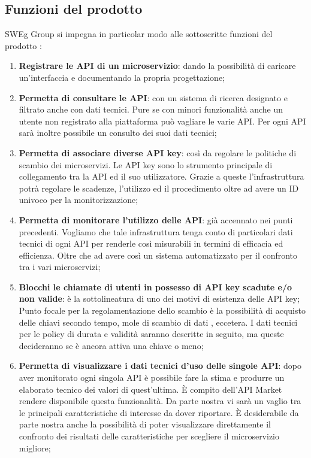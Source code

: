 \documentclass[12pt,a4paper,titlepage]{article}
\begin{document}
	\subsection{Funzioni del prodotto}
	SWEg Group si impegna in particolar modo alle sottoscritte funzioni del prodotto :
	\begin{enumerate}
		\item \textbf{Registrare le API di un microservizio}: dando la possibilità di caricare un'interfaccia e documentando la propria progettazione;
		\item \textbf{Permetta di consultare le API}: con un sistema di ricerca designato e filtrato anche con dati tecnici. Pure se con minori funzionalità anche un utente non registrato alla piattaforma può vagliare le varie API. Per ogni API sarà inoltre possibile un consulto dei suoi dati tecnici;
		\item \textbf{Permetta di associare diverse API key}: così da regolare le politiche di scambio dei microservizi. Le API key sono lo strumento principale di collegamento tra la API ed il suo utilizzatore. Grazie a queste l'infrastruttura potrà regolare le scadenze, l'utilizzo ed il procedimento oltre ad avere un ID univoco per la monitorizzazione;
		\item \textbf{Permetta di monitorare l'utilizzo delle API}:	già accennato nei punti precedenti. Vogliamo che tale infrastruttura tenga conto di particolari dati tecnici di ogni API per renderle così misurabili in termini di efficacia ed efficienza. Oltre che ad avere così un sistema automatizzato per il confronto tra i vari microservizi;
		\item \textbf{Blocchi le chiamate di utenti in possesso di API key scadute e/o non valide}:	è la sottolineatura di uno dei motivi di esistenza delle API key; Punto focale per la regolamentazione dello scambio è la possibilità di acquisto delle chiavi secondo tempo, mole di scambio di dati , eccetera. I dati tecnici per le policy di durata e validità saranno descritte in seguito, ma queste decideranno se è ancora attiva una chiave o meno;
		\item \textbf{Permetta di visualizzare i dati tecnici d'uso delle singole API}:	dopo aver monitorato ogni singola API è possibile fare la stima e produrre un elaborato tecnico dei valori di quest'ultima. È compito dell'API Market rendere disponibile questa funzionalità. Da parte nostra vi sarà un vaglio tra le principali caratteristiche di interesse da dover riportare. È desiderabile da parte nostra anche la possibilità di poter visualizzare direttamente il confronto dei risultati delle caratteristiche per scegliere il microservizio migliore;

\end{enumerate}
\end{document}

